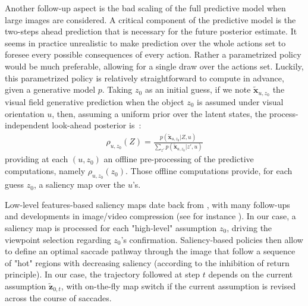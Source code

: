 \documentclass{article} %
\begin{document}
Another follow-up aspect is the bad scaling of the full predictive model when large images are considered. A critical component of the predictive model is the two-steps ahead prediction that is necessary for the future posterior estimate. It seems in practice unrealistic to make prediction over the whole actions set to foresee every possible consequences of every action. Rather a parametrized policy would be much preferable, allowing for a single draw over the actions set.
Luckily, this parametrized policy is relatively straightforward to compute in advance, given a generative model $p$. Taking $z_0$ as an initial guess, if we note $\tilde{\boldsymbol{x}}_{u,z_0}$ the visual field generative prediction when the object $z_0$ is assumed under visual orientation $u$, then, assuming a uniform prior over the latent states, the process-independent look-ahead posterior is~:
\begin{align}
\rho_{u, z_0} (Z)=  \frac{p(\tilde{\boldsymbol{x}}_{u, z_0}|Z,u)}{\sum_{z'} p(\tilde{\boldsymbol{x}}_{u, z_0}|z',u)}
\end{align}
providing at each $(u, z_0)$ an offline pre-processing of the predictive computations, namely $\rho_{u, z_0}(z_0)$. Those offline computations provide, for each guess $z_0$, a saliency map over the $u$'s. 

Low-level features-based saliency maps date back from \cite{itti2001computational}, with many follow-ups and developments in image/video compression (see for instance \cite{wang2003foveation}). In our case, a saliency map is processed for each "high-level" assumption $z_0$, driving the viewpoint selection regarding $z_0$'s confirmation.
Saliency-based policies then allow to define an optimal saccade pathway through the image that follow a sequence of "hot" regions with decreasing saliency (according to the inhibition of return principle).
In our case, the trajectory followed at step $t$ depends on the current assumption $\tilde{\boldsymbol{z}}_{0,t}$, with on-the-fly map switch if the current assumption is revised across the course of saccades.
\end{document}
